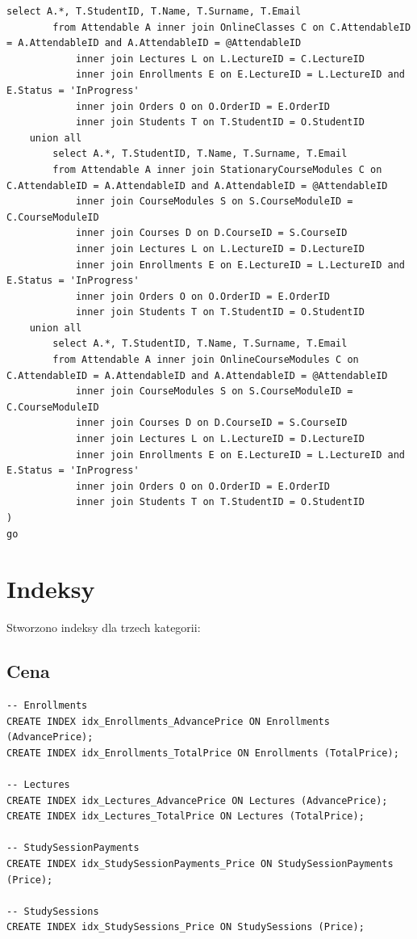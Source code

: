 \documentclass[11pt,a4paper]{article}
\begin{document}
\begin{Verbatim}[breaklines=true]
        select A.*, T.StudentID, T.Name, T.Surname, T.Email
        from Attendable A inner join OnlineClasses C on C.AttendableID = A.AttendableID and A.AttendableID = @AttendableID
            inner join Lectures L on L.LectureID = C.LectureID
            inner join Enrollments E on E.LectureID = L.LectureID and E.Status = 'InProgress'
            inner join Orders O on O.OrderID = E.OrderID
            inner join Students T on T.StudentID = O.StudentID
    union all
        select A.*, T.StudentID, T.Name, T.Surname, T.Email
        from Attendable A inner join StationaryCourseModules C on C.AttendableID = A.AttendableID and A.AttendableID = @AttendableID
            inner join CourseModules S on S.CourseModuleID = C.CourseModuleID
            inner join Courses D on D.CourseID = S.CourseID
            inner join Lectures L on L.LectureID = D.LectureID
            inner join Enrollments E on E.LectureID = L.LectureID and E.Status = 'InProgress'
            inner join Orders O on O.OrderID = E.OrderID
            inner join Students T on T.StudentID = O.StudentID
    union all
        select A.*, T.StudentID, T.Name, T.Surname, T.Email
        from Attendable A inner join OnlineCourseModules C on C.AttendableID = A.AttendableID and A.AttendableID = @AttendableID
            inner join CourseModules S on S.CourseModuleID = C.CourseModuleID
            inner join Courses D on D.CourseID = S.CourseID
            inner join Lectures L on L.LectureID = D.LectureID
            inner join Enrollments E on E.LectureID = L.LectureID and E.Status = 'InProgress'
            inner join Orders O on O.OrderID = E.OrderID
            inner join Students T on T.StudentID = O.StudentID
)
go
\end{Verbatim}

\section{Indeksy}
Stworzono indeksy dla trzech kategorii:
\subsection{Cena}
\begin{Verbatim}[breaklines=true]
-- Enrollments
CREATE INDEX idx_Enrollments_AdvancePrice ON Enrollments (AdvancePrice);
CREATE INDEX idx_Enrollments_TotalPrice ON Enrollments (TotalPrice);

-- Lectures
CREATE INDEX idx_Lectures_AdvancePrice ON Lectures (AdvancePrice);
CREATE INDEX idx_Lectures_TotalPrice ON Lectures (TotalPrice);

-- StudySessionPayments
CREATE INDEX idx_StudySessionPayments_Price ON StudySessionPayments (Price);

-- StudySessions
CREATE INDEX idx_StudySessions_Price ON StudySessions (Price);
\end{Verbatim}
\end{document}
